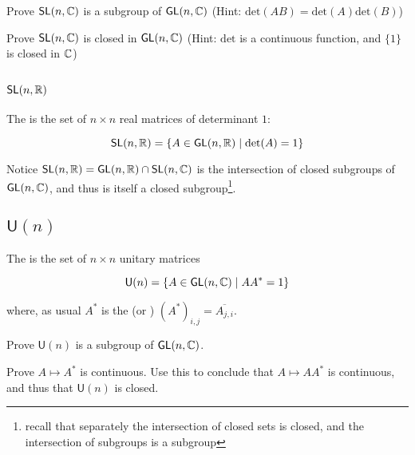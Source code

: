 \documentclass[../main.tex]{subfiles}
\begin{document}
\begin{ExerciseList}
  \Exercise[label={ex:SLn-subgroup}] Prove $\mathsf{SL}(n,\mathbb{C})$ is a subgroup of $\mathsf{GL}(n,\mathbb{C})$
  (Hint: $\text{det}(AB) = \text{det}(A) \text{det}(B)$)

  \Exercise[label={ex:SLn-closed}] Prove $\mathsf{SL}(n,\mathbb{C})$ is closed in $\mathsf{GL}(n,\mathbb{C})$
  (Hint: $\text{det}$ is a continuous function, and $\{1\}$ is closed in $\mathbb{C}$)
\end{ExerciseList}

\subsection{$\mathsf{SL}(n,\mathbb{R})$}

\begin{defn}
  The  is the set of $n \times n$ real
  matrices of determinant $1$:

  \[
    \mathsf{SL}(n,\mathbb{R}) = \{ A \in \mathsf{GL}(n,\mathbb{R}) \mid \text{det}(A) = 1 \}
  \]
\end{defn}

Notice $\mathsf{SL}(n,\mathbb{R}) = \mathsf{GL}(n,\mathbb{R}) \cap \mathsf{SL}(n,\mathbb{C})$ is the 
intersection of closed subgroups of $\mathsf{GL}(n,\mathbb{C})$, and thus is itself
a closed subgroup\footnote{recall that separately the intersection of closed sets is closed, 
and the intersection of subgroups is a subgroup}.
  
\subsection{$\mathsf{U}(n)$}

\begin{defn}
  The  is the set of $n \times n$ unitary matrices

  \[
    \mathsf{U}(n) = \{ A \in \mathsf{GL}(n,\mathbb{C}) \mid A A^* = 1 \}
  \]

  where, as usual $A^*$ is the  
  (or ) $(A^*)_{i,j} = \overline{A_{j,i}}$.
\end{defn}

\begin{ExerciseList}
  \Exercise[label={ex:Un-subgroup}] Prove $\mathsf{U}(n)$ is a subgroup of $\mathsf{GL}(n,\mathbb{C})$.

  \Exercise[label={ex:Un-closed}] Prove $A \mapsto A^*$ is continuous. Use this to 
  conclude that $A \mapsto A A^*$ is continuous, and thus that $\mathsf{U}(n)$ is closed.
\end{ExerciseList}
\end{document}
